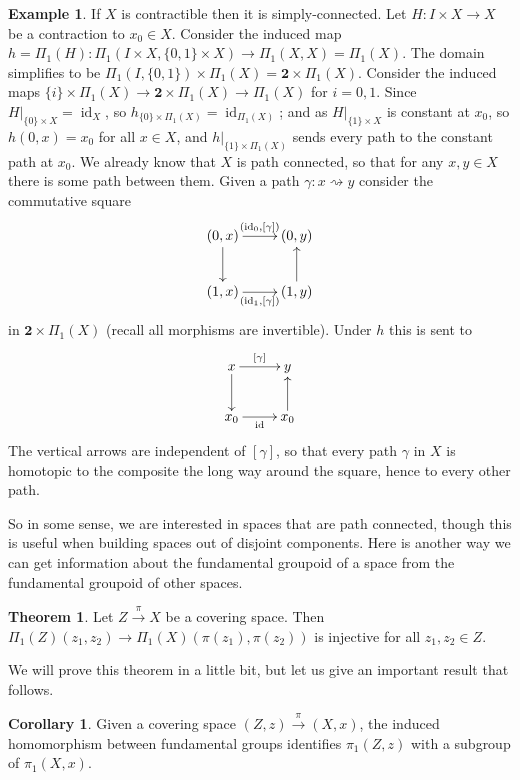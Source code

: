 \documentclass{tufte-handout}
\newcommand{\lecturenum}[1]{\marginnote{\color{red}Lecture #1}}
\DeclareMathOperator{\id}{id}
\theoremstyle{definition}
\newtheorem{example}{Example}
\newtheorem{theorem}{Theorem}
\newtheorem{corollary}{Corollary}
\begin{document}
\begin{example}
If $X$ is contractible then it is simply-connected. Let $H\colon I\times X \to X$ be a 
contraction to $x_0\in X$. Consider the induced map $h= \Pi_1(H)\colon \Pi_1(I\times X, 
\{0,1\}\times X) \to \Pi_1(X,X) = \Pi_1(X)$. The domain simplifies to be 
$\Pi_1(I,\{0,1\})\times \Pi_1(X) = \mathbf{2}\times \Pi_1(X)$. Consider the induced maps 
$\{i\}\times \Pi_1(X)\to \mathbf{2}\times \Pi_1(X) \to \Pi_1(X)$ for $i=0,1$. Since 
$H\big|_{\{0\}\times X}=\id_X$, so $h_{\{0\}\times \Pi_1(X)}=\id_{\Pi_1(X)}$; and as 
$H\big|_{\{1\}\times X}$ is constant at $x_0$, so $h(0,x) = x_0$ for all $x\in X$, and 
$h\big|_{\{1\}\times \Pi_1(X)}$ sends every path to the constant path at $x_0$. We 
already know that $X$ is path connected, so that for any $x,y\in X$ there is some path 
between them. Given a path $\gamma\colon x\rightsquigarrow y$ consider the commutative square
\[
	\xymatrix{
	(0,x) \ar[r]^{(\id_0,[\gamma])} \ar[d] & (0,y) \\
	(1,x) \ar[r]_{(\id_1,[\gamma])} & (1,y) \ar[u]
	}
\]
in $\mathbf{2}\times \Pi_1(X)$ (recall all morphisms are invertible). Under $h$ this is sent to
\[
	\xymatrix{
	x\ar[r]^{[\gamma]} \ar[d] & y \\
	x_0 \ar[r]_{\id} & x_0 \ar[u]
	}
\]
The vertical arrows are independent of $[\gamma]$, so that every path $\gamma$ in $X$ is 
homotopic to the composite the long way around the square, hence to every other path.
\end{example}

So\lecturenum{9} in some sense, we are interested in spaces that are path connected, though this is 
useful when building spaces out of disjoint components. Here is another way we can get 
information about the fundamental groupoid of a space from the fundamental groupoid of 
other spaces.

\begin{theorem}\label{thm:cov_space_gives_faithful_functor}
Let $Z\xrightarrow{\pi} X$ be a covering space. 
Then $\Pi_1(Z)(z_1,z_2) \to \Pi_1(X)(\pi(z_1),\pi(z_2))$ is injective for all $z_1,z_2\in Z$.
\end{theorem}

We will prove this theorem in a little bit, but let us give an important result that follows.

\begin{corollary}
Given a covering space $(Z,z)\xrightarrow{\pi}(X,x)$, the induced homomorphism between fundamental groups identifies $\pi_1(Z,z)$ with a subgroup of 
$\pi_1(X,x)$.
\end{corollary}
\end{document}
